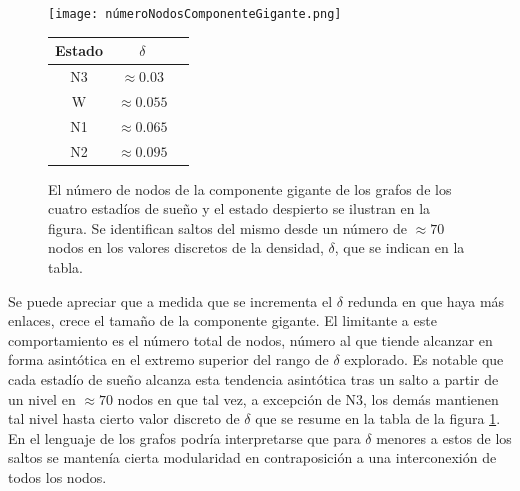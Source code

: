 \documentclass{article}
\begin{document}
\begin{figure}[ht]
\begin{minipage}[t]{.71\linewidth}
  \vspace{0pt}
  \centering
  \texttt{[image: númeroNodosComponenteGigante.png]}
\end{minipage}%
\begin{minipage}[t]{.35\linewidth}
  \vspace{0.5cm}
  \centering
  \begin{tabular}{ccc}
	\toprule
	Estado & $\delta$  \\
	\midrule
	N3 & $\approx 0.03$  \\
	W & $\approx 0.055$   \\
	N1 & $\approx 0.065$  \\
	N2 & $\approx 0.095$  \\
	\bottomrule
  \end{tabular}
\end{minipage}
  \caption{El número de nodos de la componente gigante de los grafos de los cuatro estadíos de sueño y el estado despierto se ilustran en la figura. Se identifican saltos del mismo desde un número de $\approx 70$ nodos en los valores discretos de la densidad, $\delta$, que se indican en la tabla.}
  \label{fg:nodosNúmero}
\end{figure}

Se puede apreciar que a medida que se incrementa el $\delta$ redunda en que haya más enlaces, crece el tamaño de la componente gigante.
El limitante a este comportamiento es el número total de nodos, número al que tiende alcanzar en forma asintótica en el extremo superior del rango de $\delta$ explorado.
Es notable que cada estadío de sueño alcanza esta tendencia asintótica tras un salto a partir de un nivel en $\approx 70$ nodos en que tal vez, a excepción de N3, los demás mantienen tal nivel hasta cierto valor discreto de $\delta$ que se resume en la tabla de la figura \ref{fg:nodosNúmero}.
En el lenguaje de los grafos podría interpretarse que para $\delta$ menores a estos de los saltos se mantenía cierta modularidad en contraposición a una interconexión de todos los nodos. 
\end{document}
